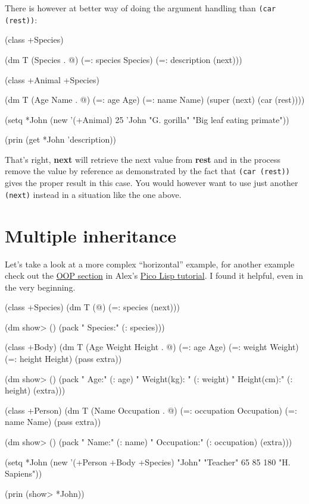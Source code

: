 There is however at better way of doing the argument handling than
\texttt{(car (rest))}:

\begin{wideverbatim}
(class +Species)

(dm T (Species . @)
    (=: species Species)
    (=: description (next)))

(class +Animal +Species)

(dm T (Age Name . @)
    (=: age Age)
    (=: name Name)
    (super (next) (car (rest))))

(setq *John (new '(+Animal) 25 'John "G. gorilla" 
      "Big leaf eating primate"))

(prin (get *John 'description))
\end{wideverbatim}

That's right, \textbf{next} will retrieve the next value from
\textbf{rest} and in the process remove the value by reference as
demonstrated by the fact that \texttt{(car (rest))} gives the proper
result in this case. You would however want to use just another
\texttt{(next)} instead in a situation like the one above.


\section{Multiple inheritance}
\label{sec:more-oo}

Let's take a look at a more complex ``horizontal'' example, for
another example check out the
\href{http://www.software-lab.de/tut.html#oop}{OOP section} in Alex's
\href{http://www.software-lab.de/tut.html}{Pico Lisp tutorial}. I
found it helpful, even in the very beginning.

\begin{wideverbatim}
(class +Species)
(dm T (@)
    (=: species (next)))

(dm show> ()
    (pack " Species:" (: species)))

(class +Body)
(dm T (Age Weight Height . @)
    (=: age Age)
    (=: weight Weight)
    (=: height Height)
    (pass extra))

(dm show> ()
    (pack " Age:" (: age) " Weight(kg):
     " (: weight) " Height(cm):" (: height) (extra)))

(class +Person)
(dm T (Name Occupation . @)
    (=: occupation Occupation)
    (=: name Name)
    (pass extra))

(dm show> ()
    (pack " Name:" (: name) " Occupation:" (: occupation) (extra)))

(setq *John (new '(+Person +Body +Species) 
      "John" "Teacher" 65 85 180 "H. Sapiens"))

(prin (show> *John))
\end{wideverbatim}

